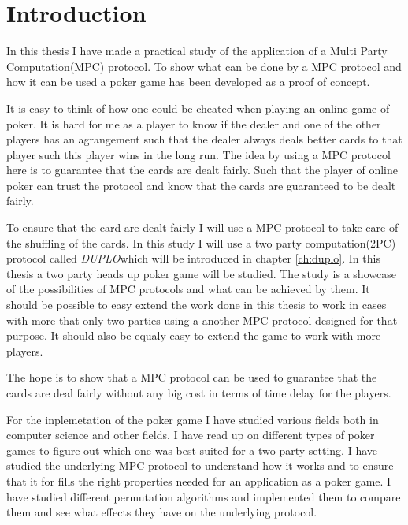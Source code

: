 \documentclass[twoside,11pt,openright]{report}
\newcommand{\DUPLO}{\textit{DUPLO}}
\begin{document}
\chapter{Introduction}
\label{ch:intro}
In this thesis I have made a practical study of the application of a Multi Party Computation(MPC) protocol. To show what can be done by a MPC protocol and how it can be used a poker game has been developed as a proof of concept.

It is easy to think of how one could be cheated when playing an online game of poker. It is hard for me as a player to know if the dealer and one of the other players has an agrangement such that the dealer always deals better cards to that player such this player wins in the long run. The idea by using a MPC protocol here is to guarantee that the cards are dealt fairly. Such that the player of online poker can trust the protocol and know that the cards are guaranteed to be dealt fairly.

To ensure that the card are dealt fairly I will use a MPC protocol to take care of the shuffling of the cards. In this study I will use a two party computation(2PC) protocol called \DUPLO which will be introduced in chapter \ref{ch:duplo}. In this thesis a two party heads up poker game will be studied. The study is a showcase of the possibilities of MPC protocols and what can be achieved by them. It should be possible to easy extend the work done in this thesis to work in cases with more that only two parties using a another MPC protocol designed for that purpose. It should also be equaly easy to extend the game to work with more players.

The hope is to show that a MPC protocol can be used to guarantee that the cards are deal fairly without any big cost in terms of time delay for the players.

\bigskip

For the inplemetation of the poker game I have studied various fields both in computer science and other fields. I have read up on different types of poker games to figure out which one was best suited for a two party setting. I have studied the underlying MPC protocol to understand how it works and to ensure that it for fills the right properties needed for an application as a poker game. I have studied different permutation algorithms and implemented them to compare them and see what effects they have on the underlying protocol.
\end{document}
